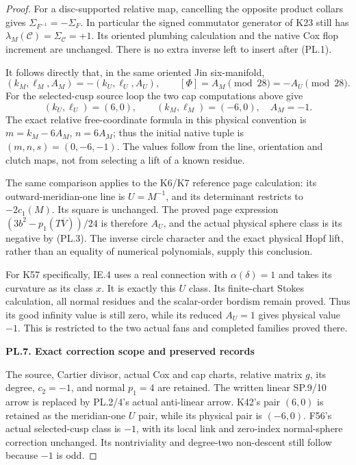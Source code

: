 \begin{proof}
For a disc-supported relative map, cancelling the opposite product
collars gives \(\Sigma_{F^{-1}}=-\Sigma_F\). In particular the
signed commutator generator of K23 still has
\(\lambda_M(\mathcal C)=\Sigma_{\mathcal C}=+1\). Its oriented
plumbing calculation and the native Cox flop increment are unchanged.
There is no extra inverse left to insert after (PL.1).

It follows directly that, in the same oriented Jin six-manifold,
\[
 (k_M,\ell_M,A_M)=-(k_U,\ell_U,A_U),\qquad
 [\Phi]=A_M\pmod {28}=-A_U\pmod {28}.                 \tag{PL.3}
\]
For the selected-cusp source loop the two cap computations above give
\[
 (k_U,\ell_U)=(6,0),\qquad(k_M,\ell_M)=(-6,0),
 \quad A_M=-1.
\]
The exact relative free-coordinate formula in this physical convention
is \(m=k_M-6A_M\), \(n=6A_M\); thus the initial native tuple is
\((m,n,s)=(0,-6,-1)\). The values follow from the line, orientation
and clutch maps, not from selecting a lift of a known residue.

The same comparison applies to the K6/K7 reference page calculation:
its outward-meridian-one line is \(U=M^{-1}\), and its determinant
restricts to \(-2c_1(M)\). Its square is unchanged. The proved page
expression \((3b^2-p_1(T\overline V))/24\) is therefore \(A_U\),
and the actual physical sphere class is its negative by (PL.3).
The inverse circle character and the exact physical Hopf lift, rather
than an equality of numerical polynomials, supply this conclusion.

For K57 specifically, IE.4 uses a real connection with
\(\alpha(\delta)=1\) and takes its curvature as its class \(x\).
It is exactly this \(U\) class. Its finite-chart Stokes calculation,
all normal residues and the scalar-order bordism remain proved.
Thus its good infinity value is still zero, while its reduced
\(A_U=1\) gives physical value \(-1\). This is restricted to the
two actual fans and completed families proved there.

\par

\medskip\noindent\textbf{PL.7. Exact correction scope and preserved records}

\par\nopagebreak[4]

The source, Cartier divisor, actual Cox and cap charts, relative
matrix \(g\), its degree, \(c_2=-1\), and normal \(p_1=4\) are
retained. The written linear SP.9/10 arrow is replaced by PL.2/4's
actual anti-linear arrow. K42's pair \((6,0)\) is retained as the
meridian-one \(U\) pair, while its physical pair is \((-6,0)\).
F56's actual selected-cusp class is \(-1\), with its local link and
zero-index normal-sphere correction unchanged. Its nontriviality
and degree-two non-descent still follow because \(-1\) is odd.


\end{proof}
